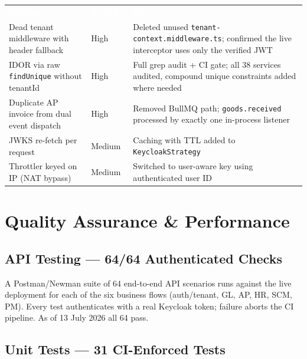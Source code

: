 \documentclass[11pt,a4paper]{article}
\newcommand{\code}[1]{\texttt{\small #1}}
\begin{document}
\begin{table}[H]
\centering\small
\renewcommand{\arraystretch}{1.25}
\begin{tabularx}{\textwidth}{l l X}
\toprule
\rowcolor{amdoxnavy}
\textcolor{white}{\textbf{Finding}} &
\textcolor{white}{\textbf{Severity}} &
\textcolor{white}{\textbf{Fix}} \\
Dead tenant middleware with header fallback & High &
  Deleted unused \code{tenant-context.middleware.ts}; confirmed the live interceptor uses only the verified JWT \\
\rowcolor{amdoxlight}
IDOR via raw \code{findUnique} without tenantId & High &
  Full grep audit + CI gate; all 38 services audited, compound unique constraints added where needed \\
Duplicate AP invoice from dual event dispatch & High &
  Removed BullMQ path; \code{goods.received} processed by exactly one in-process listener \\
\rowcolor{amdoxlight}
JWKS re-fetch per request & Medium &
  Caching with TTL added to \code{KeycloakStrategy} \\
Throttler keyed on IP (NAT bypass) & Medium &
  Switched to user-aware key using authenticated user ID \\
\bottomrule
\end{tabularx}
\end{table}

\section{Quality Assurance \& Performance}\label{sec:qa}

\subsection{API Testing --- 64/64 Authenticated Checks}

A Postman/Newman suite of 64 end-to-end API scenarios runs against the live deployment
for each of the six business flows (auth/tenant, GL, AP, HR, SCM, PM). Every test
authenticates with a real Keycloak token; failure aborts the CI pipeline. As of 13
July 2026 all 64 pass.

\subsection{Unit Tests --- 31 CI-Enforced Tests}
\end{document}
